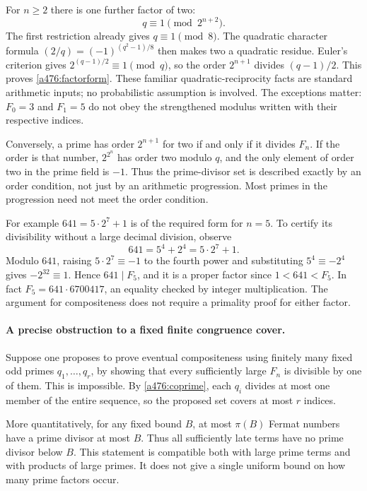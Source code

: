 \documentclass[11pt]{article}
\begin{document}
For $n\geq2$ there is one further factor of two:
\begin{equation}\label{a476:factorform}
                       q\equiv1\pmod{2^{n+2}}.
\end{equation}
The first restriction already gives $q\equiv1\pmod8$. The quadratic
character formula $(2/q)=(-1)^{(q^2-1)/8}$ then makes two a quadratic
residue. Euler's criterion gives $2^{(q-1)/2}\equiv1\pmod q$, so
the order $2^{n+1}$ divides $(q-1)/2$. This proves
\eqref{a476:factorform}. These familiar quadratic-reciprocity facts
are standard arithmetic inputs; no probabilistic assumption is involved.
The exceptions matter: $F_0=3$ and $F_1=5$ do not obey the strengthened
modulus written with their respective indices.

Conversely, a prime has order $2^{n+1}$ for two if and only if it
divides $F_n$. If the order is that number, $2^{2^n}$ has order two
modulo $q$, and the only element of order two in the prime field is
$-1$. Thus the prime-divisor set is described exactly by an order
condition, not just by an arithmetic progression. Most primes in the
progression need not meet the order condition.

For example $641=5\cdot2^7+1$ is of the required form for $n=5$.
To certify its divisibility without a large decimal division, observe
\[
                   641=5^4+2^4=5\cdot2^7+1.
\]
Modulo $641$, raising $5\cdot2^7\equiv-1$ to the fourth power and
substituting $5^4\equiv-2^4$ gives $-2^{32}\equiv1$. Hence
$641\mid F_5$, and it is a proper factor since $1<641<F_5$.
In fact $F_5=641\cdot6700417$, an equality checked by integer
multiplication. The argument for compositeness does not require a
primality proof for either factor.

\paragraph{A precise obstruction to a fixed finite congruence cover.}
Suppose one proposes to prove eventual compositeness using finitely many
fixed odd primes $q_1,\ldots,q_r$, by showing that every sufficiently
large $F_n$ is divisible by one of them. This is impossible. By
\eqref{a476:coprime}, each $q_i$ divides at most one member of the
entire sequence, so the proposed set covers at most $r$ indices.

More quantitatively, for any fixed bound $B$, at most $\pi(B)$ Fermat
numbers have a prime divisor at most $B$. Thus all sufficiently late
terms have no prime divisor below $B$. This statement is compatible
both with large prime terms and with products of large primes. It does
not give a single uniform bound on how many prime factors occur.
\end{document}
